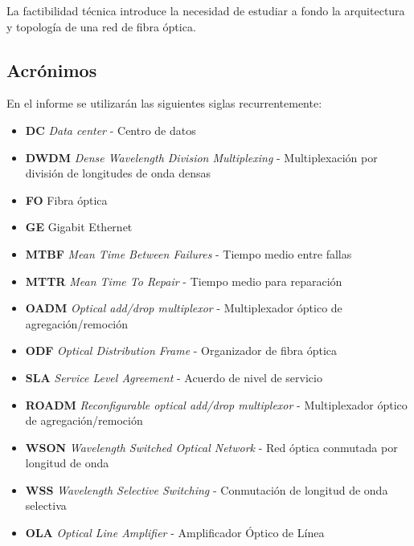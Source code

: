 La factibilidad técnica introduce la necesidad de estudiar a fondo la
arquitectura y topología de una red de fibra óptica.

\subsection{Acrónimos}
\label{sec:acronimos}

En el informe se utilizarán las siguientes siglas recurrentemente:
\begin{itemize}
\item \textbf{DC} \emph{Data center} - Centro de datos
\item \textbf{DWDM} \emph{Dense Wavelength Division Multiplexing} - Multiplexación por división de longitudes de onda densas
\item \textbf{FO} Fibra óptica
\item \textbf{GE} Gigabit Ethernet
\item \textbf{MTBF} \emph{Mean Time Between Failures} - Tiempo medio entre fallas
\item \textbf{MTTR} \emph{Mean Time To Repair} - Tiempo medio para reparación
\item \textbf{OADM} \emph{Optical add/drop multiplexor} - Multiplexador óptico de agregación/remoción
\item \textbf{ODF} \emph{Optical Distribution Frame} - Organizador de fibra óptica
\item \textbf{SLA} \emph{Service Level Agreement} - Acuerdo de nivel de servicio
\item \textbf{ROADM} \emph{Reconfigurable optical add/drop multiplexor} - Multiplexador óptico de agregación/remoción
\item \textbf{WSON} \emph{Wavelength Switched Optical Network} - Red óptica conmutada por longitud de onda
\item \textbf{WSS} \emph{Wavelength Selective Switching} - Conmutación de longitud de onda selectiva
\item \textbf{OLA} \emph{Optical Line Amplifier} - Amplificador Óptico de Línea
\end{itemize}